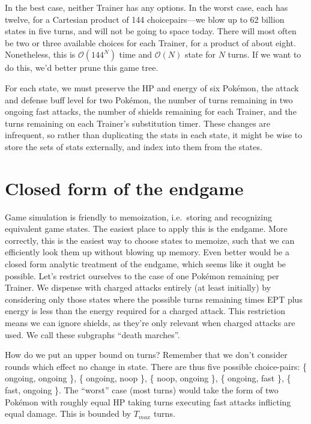 In the best case, neither Trainer has any options.
In the worst case, each has twelve, for a Cartesian product of 144 choicepairs---we
  blow up to 62 billion states in five turns, and will not be going to space today.
There will most often be two or three available choices for each Trainer,
  for a product of about eight.
Nonetheless, this is $\mathcal{O}(144^N)$ time and $\mathcal{O}(N)$ state for $N$ turns.
If we want to do this, we'd better prune this game tree.

For each state, we must preserve the HP and energy of six Pokémon,
  the attack and defense buff level for two Pokémon,
  the number of turns remaining in two ongoing fast attacks,
  the number of shields remaining for each Trainer,
  and the turns remaining on each Trainer's substitution timer.
These changes are infrequent, so rather than duplicating the stats in
  each state, it might be wise to store the sets of stats externally,
  and index into them from the states.

\section{Closed form of the endgame}
\label{sec:endgame}
Game simulation is friendly to memoization, i.e.\ storing and recognizing equivalent game states.
The easiest place to apply this is the endgame.
More correctly, this is the easiest way to choose states to memoize,
  such that we can efficiently look them up without blowing up memory.
Even better would be a closed form analytic treatment of the endgame,
  which seems like it ought be possible.
Let's restrict ourselves to the case of one Pokémon remaining per Trainer.
We dispense with charged attacks entirely (at least initially) by considering
  only those states where the possible turns remaining times EPT plus
  energy is less than the energy required for a charged attack.
This restriction means we can ignore shields, as they're only relevant
  when charged attacks are used.
We call these subgraphs ``death marches''.

How do we put an upper bound on turns?
Remember that we don't consider rounds which effect no change in state.
There are thus five possible choice-pairs:
  \{ ongoing, ongoing \},
  \{ ongoing, noop \},
  \{ noop, ongoing \},
  \{ ongoing, fast \},
  \{ fast, ongoing \}.
The ``worst'' case (most turns) would take the form of two Pokémon
  with roughly equal HP taking turns executing fast attacks
  inflicting equal damage.
This is bounded by $T_{max}$ turns.

